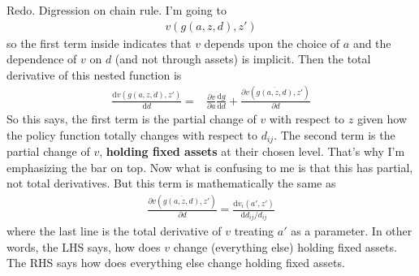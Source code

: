 \documentclass[12pt,pdftex]{article}
\begin{document}
\begin{onehalfspacing}
\hrulefill

Redo. Digression on chain rule. I'm going to 
\begin{align}
v(g(a,z,d), z')
\end{align}
so the first term inside indicates that $v$ depends upon the choice of $a$ and the dependence of $v$ on $d$ (and not through assets) is implicit. Then the total derivative of this nested function is
\begin{align}
\frac{\mathrm{d} v(g(a,z,d), z')}{\mathrm{d} d} =& \frac{\partial v}{\partial a}\frac{\mathrm{d}g}{\mathrm{d}d} +  \frac{\partial v(\overline{g(a,z,d)},z')}{\partial d}
\end{align}
So this says, the first term is the partial change of $v$ with respect to $z$ given how the policy function totally changes with respect to $d_{ij}$. The second term is the partial change of $v$, \textbf{holding fixed assets} at their chosen level. That's why I'm emphasizing the bar on top. Now what is confusing to me is that this has partial, not total derivatives. But this term is mathematically the same as
\begin{align}
\frac{\partial v(\overline{g(a,z,d)},z')}{\partial d} = \frac{\mathrm{d} v_i(a', z')}{\mathrm{d} d_{ij} / d_{ij}}
\end{align}
where the last line is the total derivative of $v$ treating $a'$ as a parameter. In other words, the LHS says, how does $v$ change (everything else) holding fixed assets. The RHS says how does everything else change holding fixed assets. 

\hrulefill


\end{onehalfspacing}
\end{document}
